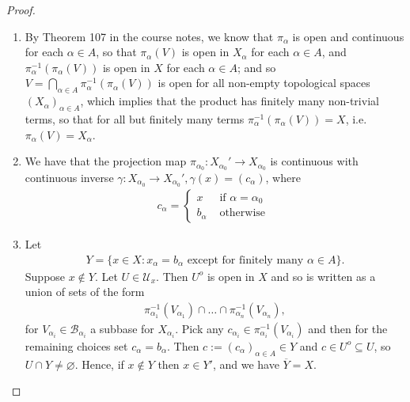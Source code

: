 \documentclass[12pt]{extarticle}
\newcommand{\set}[1]{\{#1\}}
\newcommand{\<}{\langle}
\renewcommand{\>}{\rangle}
\renewcommand{\emptyset}{\varnothing}
\theoremstyle{definition}
\begin{document}
\begin{proof}
  \begin{enumerate}
  \item
    By Theorem 107 in the course notes, we know that $\pi_{\alpha}$ is open and continuous for each $\alpha \in A$, so that $\pi_{\alpha}(V)$ is open in $X_{\alpha}$ for each $\alpha \in A$, and $\pi_{\alpha}^{-1}(\pi_{\alpha}(V))$ is open in $X$ for each $\alpha \in A$; and so $V = \bigcap\limits_{\alpha \in A} \pi_{\alpha}^{-1}(\pi_{\alpha}(V))$ is open for all non-empty topological spaces $(X_{\alpha})_{\alpha \in A}$, which implies that the product has finitely many non-trivial terms, so that for all but finitely many terms $\pi_{\alpha}^{-1}(\pi_{\alpha}(V)) = X$, i.e. $\pi_{\alpha}(V) = X_\alpha$.
  \item
    We have that the projection map $\pi_{\alpha_0}: X_{\alpha_0}' \to X_{\alpha_0}$ is continuous with continuous inverse $\gamma: X_{\alpha_0} \to X_{\alpha_0}', \gamma(x) = (c_{\alpha})$, where 
    \begin{align*}
      c_{\alpha} =
      \begin{cases}
        x & \text{ if } \alpha = \alpha_0 \\
        b_{\alpha} & \text{ otherwise } 
      \end{cases}
    \end{align*}
  \item
    Let
    \begin{align*}
      Y = \set{x \in X: x_{\alpha} = b_{\alpha} \text{ except for finitely many $\alpha \in A$}}.
    \end{align*}
    Suppose $x \not \in Y$. Let $U \in \mathcal{U}_x$. Then $U^o$ is open in $X$ and so is written as a union of sets of the form
    \begin{align*}
      \pi_{\alpha_1}^{-1}(V_{\alpha_1}) \cap \dots \cap \pi_{\alpha_n}^{-1}(V_{\alpha_n}),
    \end{align*}
    for $V_{\alpha_i} \in \mathcal{B}_{\alpha_i}$ a subbase for $X_{\alpha_i}$. Pick any $c_{\alpha_i} \in\pi_{\alpha_i}^{-1}(V_{\alpha_i})$ and then for the remaining choices set $c_{\alpha} = b_{\alpha}$.
    Then $c:=(c_{\alpha})_{\alpha \in A} \in Y$ and $c \in U^o \subseteq U$, so $U \cap Y \neq \emptyset$. Hence, if $x \not \in Y$ then $x \in Y'$,
    and we have $\overline{Y} = X$.
  \end{enumerate}
\end{proof}
\end{document}
